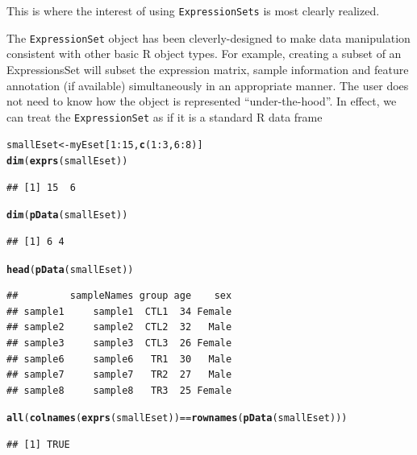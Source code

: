 \documentclass[a4paper]{article}\usepackage[]{graphicx}\usepackage[]{color}
\makeatletter
\newcommand{\hlnum}[1]{\textcolor[rgb]{0.686,0.059,0.569}{#1}}%
\newcommand{\hlopt}[1]{\textcolor[rgb]{0,0,0}{#1}}%
\newcommand{\hlstd}[1]{\textcolor[rgb]{0.345,0.345,0.345}{#1}}%
\newcommand{\hlkwb}[1]{\textcolor[rgb]{0.69,0.353,0.396}{#1}}%
\newcommand{\hlkwd}[1]{\textcolor[rgb]{0.737,0.353,0.396}{\textbf{#1}}}%
\newenvironment{kframe}{%
 \def\at@end@of@kframe{}%
 \ifinner\ifhmode%
  \def\at@end@of@kframe{\end{minipage}}%
  \begin{minipage}{\columnwidth}%
 \fi\fi%
 \def\FrameCommand##1{\hskip\@totalleftmargin \hskip-\fboxsep
 \colorbox{shadecolor}{##1}\hskip-\fboxsep
     \hskip-\linewidth \hskip-\@totalleftmargin \hskip\columnwidth}%
 \MakeFramed {\advance\hsize-\width
   \@totalleftmargin\z@ \linewidth\hsize
   \@setminipage}}%
 {\par\unskip\endMakeFramed%
 \at@end@of@kframe}
\newenvironment{knitrout}{}{} %
\makeatother
\begin{document}
This is where the interest of using \texttt{ExpressionSets} is most clearly realized.

The \texttt{ExpressionSet} object has been cleverly-designed to make data manipulation consistent with other basic R object types. For example, creating a subset of an ExpressionsSet will subset the expression
matrix, sample information and feature annotation (if available) simultaneously in an appropriate manner. The user does not need to know how the object is represented ``under-the-hood''. In effect, we can treat the \texttt{ExpressionSet} as if it is a standard R data frame

\begin{knitrout}
\color{fgcolor}\begin{kframe}
\begin{alltt}
\hlstd{smallEset} \hlkwb{<-} \hlstd{myEset[}\hlnum{1}\hlopt{:}\hlnum{15}\hlstd{,}\hlkwd{c}\hlstd{(}\hlnum{1}\hlopt{:}\hlnum{3}\hlstd{,}\hlnum{6}\hlopt{:}\hlnum{8}\hlstd{)]}
\hlkwd{dim}\hlstd{(}\hlkwd{exprs}\hlstd{(smallEset))}
\end{alltt}
\begin{verbatim}
## [1] 15  6
\end{verbatim}
\begin{alltt}
\hlkwd{dim}\hlstd{(}\hlkwd{pData}\hlstd{(smallEset))}
\end{alltt}
\begin{verbatim}
## [1] 6 4
\end{verbatim}
\begin{alltt}
\hlkwd{head}\hlstd{(}\hlkwd{pData}\hlstd{(smallEset))}
\end{alltt}
\begin{verbatim}
##         sampleNames group age    sex
## sample1     sample1  CTL1  34 Female
## sample2     sample2  CTL2  32   Male
## sample3     sample3  CTL3  26 Female
## sample6     sample6   TR1  30   Male
## sample7     sample7   TR2  27   Male
## sample8     sample8   TR3  25 Female
\end{verbatim}
\begin{alltt}
\hlkwd{all}\hlstd{(}\hlkwd{colnames}\hlstd{(}\hlkwd{exprs}\hlstd{(smallEset))}\hlopt{==}\hlkwd{rownames}\hlstd{(}\hlkwd{pData}\hlstd{(smallEset)))}
\end{alltt}
\begin{verbatim}
## [1] TRUE
\end{verbatim}
\end{kframe}
\end{knitrout}
\end{document}
